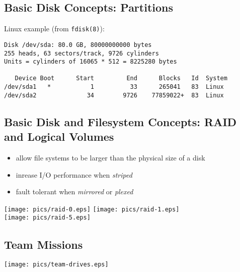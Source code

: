 \documentclass[xga]{xdvislides}
\begin{document}
\subsection{Basic Disk Concepts: Partitions}
Linux example (from {\tt fdisk(8)}):
\begin{verbatim}
Disk /dev/sda: 80.0 GB, 80000000000 bytes
255 heads, 63 sectors/track, 9726 cylinders
Units = cylinders of 16065 * 512 = 8225280 bytes

   Device Boot      Start         End      Blocks   Id  System
/dev/sda1   *           1          33      265041   83  Linux
/dev/sda2              34        9726    77859022+  83  Linux
\end{verbatim}

\subsection{Basic Disk and Filesystem Concepts: RAID and Logical Volumes}
\begin{itemize}
	\item allow file systems to be larger than the physical size of a disk
	\item inrease I/O performance when {\em striped}
	\item fault tolerant when {\em mirrored} or {\em plexed}
\end{itemize}
\vfill
\begin{center}
        \texttt{[image: pics/raid-0.eps]}
        \hspace{.5in}
        \texttt{[image: pics/raid-1.eps]} \\
        \vspace{.2in}
        \texttt{[image: pics/raid-5.eps]}
\end{center}
\vfill

\subsection{Team Missions}
\vfill
\begin{center}
	\texttt{[image: pics/team-drives.eps]} \\
\end{center}
\vfill
\end{document}
